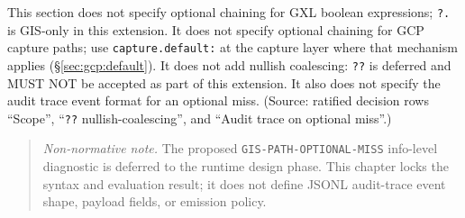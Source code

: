 This section does not specify optional chaining for GXL boolean expressions;
\texttt{?.} is GIS-only in this extension.  It does not specify optional
chaining for GCP capture paths; use \texttt{capture.default:} at the capture
layer where that mechanism applies (\S\ref{sec:gcp:default}).  It does not add
nullish coalescing: \texttt{??} is deferred and MUST NOT be accepted as part of
this extension.  It also does not specify the audit trace event format for an
optional miss.  (Source: ratified decision rows ``Scope'', ``\texttt{??}
nullish-coalescing'', and ``Audit trace on optional miss''.)

\begin{quote}
\noindent\textit{Non-normative note.}
The proposed \texttt{GIS-PATH-OPTIONAL-MISS} info-level diagnostic is deferred
to the runtime design phase.  This chapter locks the syntax and evaluation
result; it does not define JSONL audit-trace event shape, payload fields, or
emission policy.
\end{quote}
